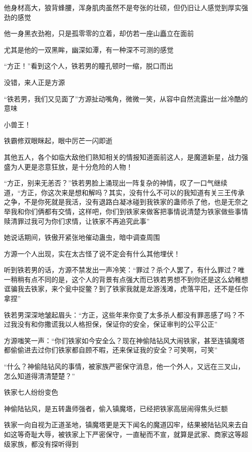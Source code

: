 \begin{this_body}
他身材高大，狼背蜂腰，浑身肌肉虽然不是夸张的壮硕，但仍旧让人感觉到厚实强劲的感觉

他一身黑衣劲袍，只是孤零零的立着，却仿若一座山矗立在面前

尤其是他的一双黑眸，幽深如潭，有一种深不可测的感觉

“方正！”看到这个人，铁若男的瞳孔顿时一缩，脱口而出

没错，来人正是方源

“铁若男，我们又见面了”方源扯动嘴角，微微一笑，从容中自然流露出一丝冷酷的意味

小兽王！

铁霸修双眼眯起，眼中厉芒一闪即逝

其他五人，各个如临大敌他们熟知相关的情报知道面前这人，是魔道新星，战力强盛为人更是恣意狂放，是十分危险的人物！

“方正，别来无恙否？”铁若男脸上涌现出一阵复杂的神情，叹了一口气继续道，“方正，你这次来是想和解吗？其实，没有什么不可以的我知道有关三王传承之争，不是你死就是我活，没有退路白凝冰碰到我铁家的蛊师杀了他，也是无奈之举我和你们俩都有交情，这样吧，你们到铁家来做客把事情说清楚为铁家做些事情赎清罪过我可为你们求情，让铁家不再追究此事”

她说话期间，铁傲开紧张地催动蛊虫，暗中调查周围

方源一个人出现，实在太古怪了说不定会有什么其他埋伏！

听到铁若男的话，方源不禁发出一声冷笑：“罪过？杀个人罢了，有什么罪过？唯一稍稍有点不同的是，这个人的背景有点强大而已铁若男想不到你还是这么幼稚想诓骗我去铁家，来个瓮中捉鳖？到了铁家我就是龙游浅滩，虎落平阳，还不是任你拿捏”

铁若男深深地皱起眉头：“方正，这些年来你变了太多杀人都没有罪恶感了吗？不过我没有和你撒谎我以人格担保，保证你的安全，保证审判的公平公正”

方源嗤笑一声：“你们铁家如今安全么？现在神偷陆钻风大闹铁家，甚至连镇魔塔都偷偷进去过你们铁家都自顾不暇，还来保证我的安全？可笑啊，可笑”

“什么？神偷陆钻风的事情，被家族严密保守消息，他一个外人，又远在三叉山，怎么知道得清清楚楚？”

铁家七人纷纷变色

神偷陆钻风，是五转蛊师强者，偷入镇魔塔，已经把铁家高层闹得焦头烂额

铁家一向自视为正道圣地，镇魔塔更是天下闻名的魔道囚牢，结果被陆钻风来去自如这等奇耻大辱，被铁家上下严密保守，一直秘而不宣，就算是武家、商家这等超级家族，都没有探听得到


\end{this_body}
